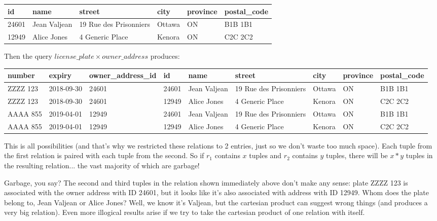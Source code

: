 \documentclass[a4paper]{report}
\begin{document}
\begin{center}
	\begin{tabular}{|l|l|l|l|l|l|}\hline
		\textbf{id} & \textbf{name} &\textbf{street} & \textbf{city} & \textbf{province} & \textbf{postal\_code} \\ \hline
		24601 & Jean Valjean & 19 Rue des Prisonniers & Ottawa & ON & B1B 1B1\\ \hline
		12949 & Alice Jones & 4 Generic Place & Kenora & ON & C2C 2C2\\ \hline
	\end{tabular}
\end{center}

Then the query $license\_plate \times owner\_address$ produces:

{\scriptsize
\begin{center}
	\begin{tabular}{|l|l|l|l|l|l|l|l|l|}\hline
		\textbf{number} & \textbf{expiry} & \textbf{owner\_address\_id} & \textbf{id} & \textbf{name} &\textbf{street} & \textbf{city} & \textbf{province} & \textbf{postal\_code} \\ \hline
		ZZZZ 123 & 2018-09-30 & 24601 & 24601 & Jean Valjean & 19 Rue des Prisonniers & Ottawa & ON & B1B 1B1\\ \hline
ZZZZ 123 & 2018-09-30 & 24601 & 12949 & Alice Jones & 4 Generic Place & Kenora & ON & C2C 2C2\\ \hline
		AAAA 855 & 2019-04-01 & 12949 & 24601 & Jean Valjean & 19 Rue des Prisonniers & Ottawa & ON & B1B 1B1\\ \hline
		AAAA 855 & 2019-04-01 & 12949 & 12949 & Alice Jones & 4 Generic Place & Kenora & ON & C2C 2C2\\ \hline
	\end{tabular}
\end{center}
}

This is all possibilities (and that's why we restricted these relations to 2 entries, just so we don't waste too much space). Each tuple from the first relation is paired with each tuple from the second. So if $r_{1}$ contains $x$ tuples and $r_{2}$ contains $y$ tuples, there will be $x*y$ tuples in the resulting relation... the vast majority of which are garbage! 

Garbage, you say? The second and third tuples in the relation shown immediately above don't make any sense: plate ZZZZ 123 is associated with the owner address with ID 24601, but it looks like it's also associated with address with ID 12949. Whom does the plate belong to, Jean Valjean or Alice Jones? Well, we know it's Valjean, but the cartesian product can suggest wrong things (and produces a very big relation). Even more illogical results arise if we try to take the cartesian product of one relation with itself.
\end{document}
